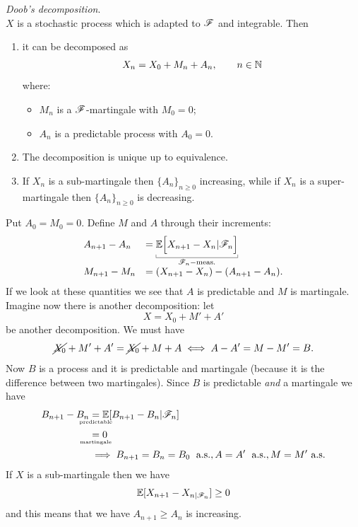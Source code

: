 \documentclass{report}
\begin{document}
\begin{theorem}
	\emph{Doob's decomposition}.\\
	$X$ is a stochastic process which is adapted to $\mathscr{F}$ and integrable. Then
	\begin{enumerate}
		\item it can be decomposed as 
		\[X_{n}=X_{0}+M_{n}+A_{n},\qquad n\in\mathbb{N}\]
		where:
		\begin{itemize}
			\item $M_{n}$ is a $\mathscr{F}$-martingale with $M_0=0$;
			\item $A_{n}$ is a predictable process with $A_0=0$.
		\end{itemize}
		\item The decomposition is unique up to equivalence.
		\item If $X_{n}$ is a sub-martingale then ${\{A_{n}\}}_{n\geq0}$ increasing, while if $X_{n}$ is a super-martingale then ${\{A_{n}\}}_{n\geq0}$ is decreasing.
	\end{enumerate}
\end{theorem}
\begin{fancyproof}
	Put $A_0=M_0=0$. Define $M$ and $A$ through their increments:
	\[ \begin{array}{l l}
		A_{n+1}-A_{n}&=\underbracket[0.3pt]{\ev\Big[X_{n+1}-X_{n}|\F_{n}\Big]}_{\F_{n}-\text{meas.}}\\
		M_{n+1}-M_{n}&=(X_{n+1}-X_{n})-(A_{n+1}-A_{n}).
	\end{array} \]
	If we look at these quantities we see that $A$ is predictable and $M$ is martingale. Imagine now there is another decomposition: let
	\[X=X_0+M'+A'\]
	be another decomposition. We must have
	\[\cancel{X_0}+M'+A'=\cancel{X_0}+M+A\iff A-A'=M-M'=B.\]
	Now $B$ is a process and it is predictable and martingale (because it is the difference between two martingales). Since $B$ is predictable \textit{and} a martingale we have
	\begin{align*}
		B_{n+1}-B_{n}&\underset{\mathclap{\text{\tiny predictable}}}{=}\ev[B_{n+1}-B_{n}|\F_{n}]\\
		&\underset{\mathclap{\text{\tiny martingale}}}{=}0\\
		&\implies B_{n+1}=B_{n}=B_0\;\as,A=A'\;\as,M=M'\as\\
	\end{align*}
	If $X$ is a sub-martingale then we have
	\[\mathbb{E}[X_{n+1}-X_{n|\mathscr{F}_{n}}]\geq0\]
	and this means that we have $A_{n+1}\geq A_{n}$ is increasing.
\end{fancyproof}
\end{document}
